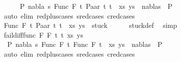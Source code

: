 \begin{isabellebody}
\ \ \ \isamarkupfalse%
\ {\isachardoublequoteopen}{\isasymnot}\ {\isacharparenleft}{\kern0pt}{\isasymexists}P{}\ nabla\ s{\isachardot}{\kern0pt}\ {\isacharparenleft}{\kern0pt}{\isacharparenleft}{\kern0pt}Func\ F\ t{\isacharcomma}{\kern0pt}\ Paar\ t{}\ t{}{\isacharparenright}{\kern0pt}\ {\isacharhash}{\kern0pt}\ xs{\isacharcomma}{\kern0pt}\ ys{\isacharparenright}{\kern0pt}\ {\isasymTurnstile}\ {\isacharparenleft}{\kern0pt}nabla{\isacharcomma}{\kern0pt}s{\isacharparenright}{\kern0pt}\ {\isasymRightarrow}\ P{}{\isacharparenright}{\kern0pt}{\isachardoublequoteclose}\isanewline
\ \ \ \ \isamarkupfalse%
\ {\isacharparenleft}{\kern0pt}auto\ elim{\isacharcolon}{\kern0pt}\ red{\isacharunderscore}{\kern0pt}plus{\isachardot}{\kern0pt}cases\ s{\isacharunderscore}{\kern0pt}red{\isachardot}{\kern0pt}cases\ c{\isacharunderscore}{\kern0pt}red{\isachardot}{\kern0pt}cases{\isacharparenright}{\kern0pt}\isanewline
\ \ \isamarkupfalse%
\ \isamarkupfalse%
\ {\isachardoublequoteopen}{\isacharparenleft}{\kern0pt}{\isacharparenleft}{\kern0pt}Func\ F\ t{\isacharcomma}{\kern0pt}\ Paar\ t{}\ t{}{\isacharparenright}{\kern0pt}\ {\isacharhash}{\kern0pt}\ xs{\isacharcomma}{\kern0pt}\ ys{\isacharparenright}{\kern0pt}\ {\isasymin}\ stuck{\isachardoublequoteclose}\isanewline
\ \ \ \ \isamarkupfalse%
\ stuck{\isacharunderscore}{\kern0pt}def\ \isamarkupfalse%
\ simp\isanewline
{}\isamarkupfalse%
\isanewline
\ \ \isamarkupfalse%
\ {\isacharparenleft}{\kern0pt}fail{\isacharunderscore}{\kern0pt}diff{\isacharunderscore}{\kern0pt}func\ F{}\ F{}\ t{}\ t{}\ xs\ ys{\isacharparenright}{\kern0pt}\isanewline
\ \ \ \isamarkupfalse%
\ {\isachardoublequoteopen}{\isasymnot}\ {\isacharparenleft}{\kern0pt}{\isasymexists}P{}\ nabla\ s{\isachardot}{\kern0pt}\ {\isacharparenleft}{\kern0pt}{\isacharparenleft}{\kern0pt}Func\ F{}\ t{}{\isacharcomma}{\kern0pt}\ Func\ F{}\ t{}{\isacharparenright}{\kern0pt}\ {\isacharhash}{\kern0pt}\ xs{\isacharcomma}{\kern0pt}\ ys{\isacharparenright}{\kern0pt}\ {\isasymTurnstile}\ {\isacharparenleft}{\kern0pt}nabla{\isacharcomma}{\kern0pt}s{\isacharparenright}{\kern0pt}\ {\isasymRightarrow}\ P{}{\isacharparenright}{\kern0pt}{\isachardoublequoteclose}\isanewline
\ \ \ \ \isamarkupfalse%
\ {\isacharparenleft}{\kern0pt}auto\ elim{\isacharcolon}{\kern0pt}\ red{\isacharunderscore}{\kern0pt}plus{\isachardot}{\kern0pt}cases\ s{\isacharunderscore}{\kern0pt}red{\isachardot}{\kern0pt}cases\ c{\isacharunderscore}{\kern0pt}red{\isachardot}{\kern0pt}cases{\isacharparenright}{\kern0pt}\isanewline

\end{isabellebody}
